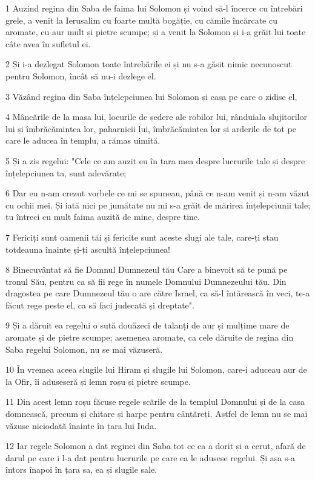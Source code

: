 \par 1 Auzind regina din Saba de faima lui Solomon și voind să-l încerce cu întrebări grele, a venit la Ierusalim cu foarte multă bogăție, cu cămile încărcate cu aromate, cu aur mult și pietre scumpe; și a venit la Solomon și i-a grăit lui toate câte avea în sufletul ei.
\par 2 Și i-a dezlegat Solomon toate întrebările ei și nu s-a găsit nimic necunoscut pentru Solomon, încât să nu-i dezlege el.
\par 3 Văzând regina din Saba înțelepciunea lui Solomon și casa pe care o zidise el,
\par 4 Mâncările de la masa lui, locurile de ședere ale robilor lui, rânduiala slujitorilor lui și îmbrăcămintea lor, paharnicii lui, îmbrăcămintea lor și arderile de tot pe care le aducea în templu, a rămas uimită.
\par 5 Și a zis regelui: "Cele ce am auzit eu în țara mea despre lucrurile tale și despre înțelepciunea ta, sunt adevărate;
\par 6 Dar eu n-am crezut vorbele ce mi se spuneau, până ce n-am venit și n-am văzut cu ochii mei. Și iată nici pe jumătate nu mi s-a grăit de mărirea înțelepciunii tale; tu întreci cu mult faima auzită de mine, despre tine.
\par 7 Fericiți sunt oamenii tăi și fericite sunt aceste slugi ale tale, care-ți stau totdeauna înainte și-ți ascultă înțelepciunea!
\par 8 Binecuvântat să fie Domnul Dumnezeul tău Care a binevoit să te pună pe tronul Său, pentru ca să fii rege în numele Domnului Dumnezeului tău. Din dragostea pe care Dumnezeul tău o are către Israel, ca să-l întărească în veci, te-a făcut rege peste el, ca să faci judecată și dreptate".
\par 9 Și a dăruit ea regelui o sută douăzeci de talanți de aur și mulțime mare de aromate și de pietre scumpe; asemenea aromate, ca cele dăruite de regina din Saba regelui Solomon, nu se mai văzuseră.
\par 10 În vremea aceea slugile lui Hiram și slugile lui Solomon, care-i aduceau aur de la Ofir, îi aduseseră și lemn roșu și pietre scumpe.
\par 11 Din acest lemn roșu făcuse regele scările de la templul Domnului și de la casa domnească, precum și chitare și harpe pentru cântăreți. Astfel de lemn nu se mai văzuse niciodată înainte în țara lui Iuda.
\par 12 Iar regele Solomon a dat reginei din Saba tot ce ea a dorit și a cerut, afară de darul pe care i l-a dat pentru lucrurile pe care ea le adusese regelui. Și așa s-a întors înapoi în țara sa, ea și slugile sale.
